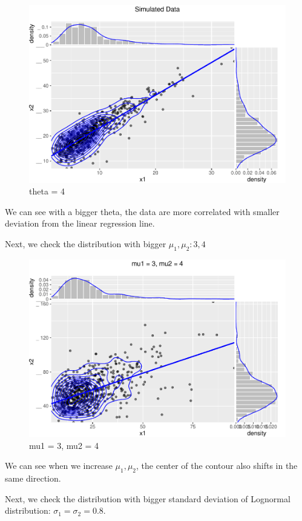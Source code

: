 \documentclass[11pt,]{article}
\begin{document}
\begin{figure}
\centering
\includegraphics{figs/unnamed-chunk-7.pdf}
\caption{theta = 4}
\end{figure}

We can see with a bigger theta, the data are more correlated with
smaller deviation from the linear regression line.

Next, we check the distribution with bigger \(\mu_1,\mu_2: 3, 4\)

\begin{figure}
\centering
\includegraphics{figs/unnamed-chunk-8.pdf}
\caption{mu1 = 3, mu2 = 4}
\end{figure}

We can see when we increase \(\mu_1,\mu_2\), the center of the contour
also shifts in the same direction.

Next, we check the distribution with bigger standard deviation of
Lognormal distribution: \(\sigma_1 =\sigma_2 = 0.8\).
\end{document}
